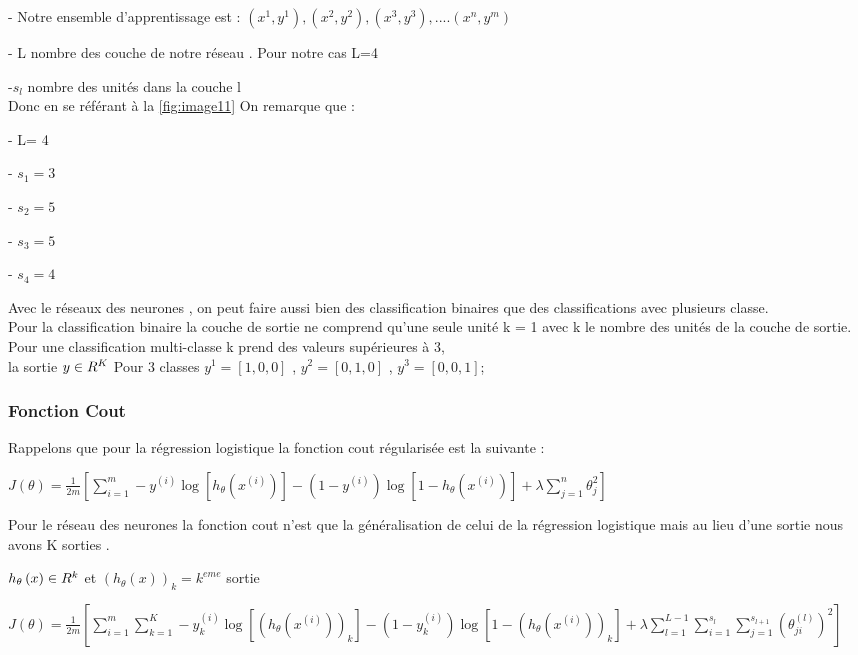  - Notre ensemble d'apprentissage est : {$({x}^{1},{y}^{1}),({x}^{2},{y}^{2}),({x}^{3},{y}^{3}),....({x}^{n},{y}^{m})$}
 
 - L nombre des couche de notre réseau . Pour notre cas L=4
 
 -${s}_{l}$ nombre des unités dans la couche l\\
 Donc en se référant à la \ref{fig:image11} On remarque que :
 
 - L= 4
 
 - ${s}_{1} = 3$
 
 - ${s}_{2} = 5$
 
 - ${s}_{3} = 5$
 
 - ${s}_{4} = 4$
 
 Avec le réseaux des neurones , on peut faire aussi bien des classification binaires que des classifications avec plusieurs classe.\\
 Pour la classification binaire la couche de sortie ne comprend qu'une seule unité k = 1 avec k le nombre des unités de la couche  de sortie.\\
 Pour une classification multi-classe k prend des valeurs supérieures à 3,\\ la sortie  $y \in {\LARGE R}^{K} $  Pour 3 classes ${y}^{1} = [1,0,0]$ , ${y}^{2} = [0,1,0]$ , ${y}^{3} = [0,0,1]$; 
 \subsubsection{Fonction Cout}
 
 Rappelons que pour la régression logistique la fonction cout régularisée est la suivante :
 
\begin{center}
 	$J\left({\theta }\right)=\frac{1}{2m}[\sum _{i=1}^{m}-{y}^{(i)}\log [{h}_{\theta}\left({x}^{(i)}\right)] -(1-{y}^{(i)})\log [1-{h}_{\theta}\left({x}^{(i)}\right)] + {\lambda} \sum _{j=1}^{n}{{\theta}_{j}^{2}}]$
\end{center} 
 Pour le réseau des neurones la  fonction cout n'est que la généralisation de celui de la régression logistique mais au lieu d'une sortie nous avons K sorties .
 
 ${h}_{\theta}\left(x\right) \in {\LARGE R}^{k} $  et 
 $({h}_{\theta}\left(x\right))_{k} = {k}^{eme} $  sortie 
 
 
  	$J\left({\theta }\right)=\frac{1}{2m}[\sum _{i=1}^{m}\sum _{k=1}^{K}-{y}_{k}^{(i)}\log [({h}_{\theta}\left({x}^{(i)}\right))_{k}] -(1-{y}_{k}^{(i)})\log [1-({h}_{\theta}\left({x}^{(i)}\right))_{k}] + {\lambda} \sum _{l=1}^{L-1}\sum _{i=1}^{{s}_{l}}\sum _{j=1}^{{s}_{l+1}}{({\theta}_{ji}^{(l)})^{2}}]$ \\

